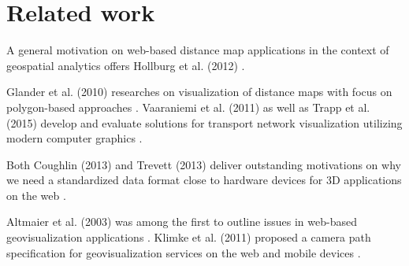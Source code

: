 \documentclass{motivation}
\begin{document}
\section{Related work}
  A general motivation on web-based distance map applications in the context of geospatial analytics offers Hollburg et al. (2012) \cite{hollburghier}.\par
  Glander et al. (2010) researches on visualization of distance maps with focus on polygon-based approaches \cite{glandererreichbarkeitskarten}. Vaaraniemi et al. (2011) as well as Trapp et al. (2015) develop and evaluate solutions for transport network visualization utilizing modern computer graphics \cite{vaaraniemi2011high}\cite{trapp2014interactive}.\par
  Both Coughlin (2013) and Trevett (2013) deliver outstanding motivations on why we need a standardized data format close to hardware devices for 3D applications on the web \cite{coughlin3d}\cite{trevett20123d}.\par
  Altmaier et al. (2003) was among the first to outline issues in web-based geovisualization applications \cite{altmaier2003applications}. Klimke et al. (2011) proposed a camera path specification for geovisualization services on the web and mobile devices \cite{klimke2013service}.
\end{document}
